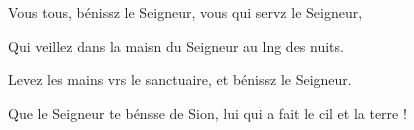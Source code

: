 \item Vous tous, bénissz le Seigneur,\psstar{} vous qui servz le Seigneur,
\item Qui veillez dans la maisn du Seigneur\psstar{} au lng des nuits.
\item Levez les mains vrs le sanctuaire,\psstar{} et bénissz le Seigneur.
\item Que le Seigneur te bénsse de Sion,\psstar{} lui qui a fait le cil et la terre !